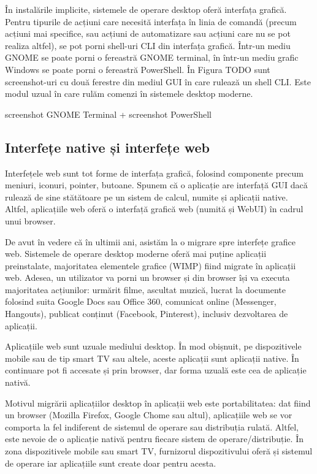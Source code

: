 În instalările implicite, sistemele de operare desktop oferă interfața grafică. Pentru tipurile de acțiuni care necesită interfața în linia de comandă (precum acțiuni mai specifice, sau acțiuni de automatizare sau acțiuni care nu se pot realiza altfel), se pot porni shell-uri CLI din interfața grafică. Într-un mediu GNOME se poate porni o fereastră GNOME terminal, în într-un mediu grafic Windows se poate porni o fereastră PowerShell. În Figura TODO sunt screenshot-uri cu două ferestre din mediul GUI în care rulează un shell CLI. Este modul uzual în care rulăm comenzi în sistemele desktop moderne.

screenshot GNOME Terminal + screenshot PowerShell

\subsection{Interfețe native și interfețe web}
\label{sec:ui:native-web}

Interfețele web sunt tot forme de interfața grafică, folosind componente precum meniuri, iconuri, pointer, butoane. Spunem că o aplicație are interfață GUI dacă rulează de sine stătătoare pe un sistem de calcul, numite și aplicații native. Altfel, aplicațiile web oferă o interfață grafică web (numită și WebUI) în cadrul unui browser.

De avut în vedere că în ultimii ani, asistăm la o migrare spre interfețe grafice web. Sistemele de operare desktop moderne oferă mai puține aplicații preinstalate, majoritatea elementele grafice (WIMP) fiind migrate în aplicații web. Adesea, un utilizator va porni un browser și din browser își va executa majoritatea acțiunilor: urmărit filme, ascultat muzică, lucrat la documente folosind suita Google Docs sau Office 360, comunicat online (Messenger, Hangouts), publicat conținut (Facebook, Pinterest), inclusiv dezvoltarea de aplicații.

Aplicațiile web sunt uzuale mediului desktop. În mod obișnuit, pe dispozitivele mobile sau de tip smart TV sau altele, aceste aplicații sunt aplicații native. În continuare pot fi accesate și prin browser, dar forma uzuală este cea de aplicație nativă.

Motivul migrării aplicațiilor desktop în aplicații web este portabilitatea: dat fiind un browser (Mozilla Firefox, Google Chome sau altul), aplicațiile web se vor comporta la fel indiferent de sistemul de operare sau distribuția rulată. Altfel, este nevoie de o aplicație nativă pentru fiecare sistem de operare/distribuție. În zona dispozitivele mobile sau smart TV, furnizorul dispozitivului oferă și sistemul de operare iar aplicațiile sunt create doar pentru acesta.

